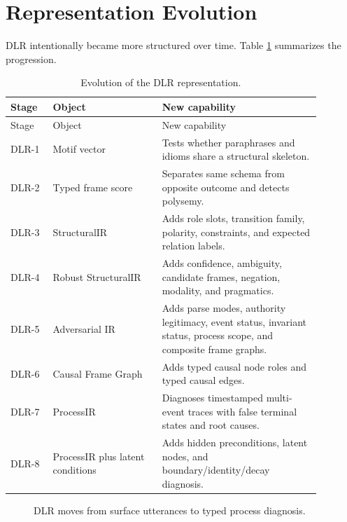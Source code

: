 \documentclass[11pt]{article}
\begin{document}
\section{Representation Evolution}

DLR intentionally became more structured over time. Table
\ref{tab:ir_evolution} summarizes the progression.

\begin{longtable}{p{0.12\linewidth}p{0.31\linewidth}p{0.45\linewidth}}
\caption{Evolution of the DLR representation.}
\label{tab:ir_evolution}\\
\toprule
Stage & Object & New capability \\
\midrule
\endfirsthead
\toprule
Stage & Object & New capability \\
\midrule
\endhead
DLR-1 & Motif vector & Tests whether paraphrases and idioms share a structural skeleton. \\
DLR-2 & Typed frame score & Separates same schema from opposite outcome and detects polysemy. \\
DLR-3 & StructuralIR & Adds role slots, transition family, polarity, constraints, and expected relation labels. \\
DLR-4 & Robust StructuralIR & Adds confidence, ambiguity, candidate frames, negation, modality, and pragmatics. \\
DLR-5 & Adversarial IR & Adds parse modes, authority legitimacy, event status, invariant status, process scope, and composite frame graphs. \\
DLR-6 & Causal Frame Graph & Adds typed causal node roles and typed causal edges. \\
DLR-7 & ProcessIR & Diagnoses timestamped multi-event traces with false terminal states and root causes. \\
DLR-8 & ProcessIR plus latent conditions & Adds hidden preconditions, latent nodes, and boundary/identity/decay diagnosis. \\
\bottomrule
\end{longtable}

\begin{figure}[h]
\centering
{}
\caption{DLR moves from surface utterances to typed process diagnosis.}
\end{figure}
\end{document}
